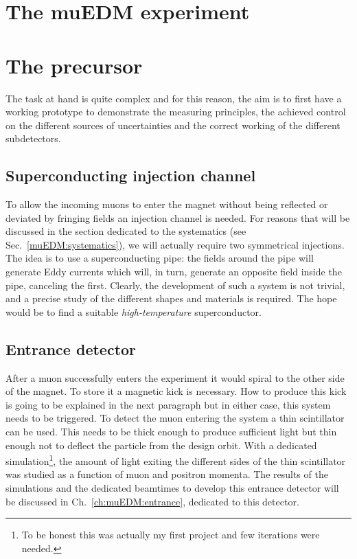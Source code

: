 \begin{refsection}
\section{The muEDM experiment}

\section{The precursor}
    The task at hand is quite complex and for this reason, the aim is to first have a working prototype to demonstrate the measuring principles, the achieved control on the different sources of uncertainties and the correct working of the different subdetectors.
    
    \subsection{Superconducting injection channel}
        To allow the incoming muons to enter the magnet without being reflected or deviated by fringing fields an injection channel is needed.
        For reasons that will be discussed in the section dedicated to the systematics (see Sec.~\ref{muEDM:systematics}), we will actually require two symmetrical injections.
        The idea is to use a superconducting pipe: the fields around the pipe will generate Eddy currents which will, in turn, generate an opposite field inside the pipe, canceling the first.
        Clearly, the development of such a system is not trivial, and a precise study of the different shapes and materials is required. 
        The hope would be to find a suitable \textit{high-temperature} superconductor.

    \subsection{Entrance detector} 
        After a muon successfully enters the experiment it would spiral to the other side of the magnet. 
        To store it a magnetic kick is necessary. 
        How to produce this kick is going to be explained in the next paragraph but in either case, this system needs to be triggered.
        To detect the muon entering the system a thin scintillator can be used.
        This needs to be thick enough to produce sufficient light but thin enough not to deflect the particle from the design orbit.
        With a dedicated \gf simulation\footnote{To be honest this was actually my first \gf project and few iterations were needed.}, the amount of light exiting the different sides of the thin scintillator was studied as a function of muon and positron momenta. 
        The results of the simulations and the dedicated beamtimes to develop this entrance detector will be discussed in Ch.~\ref{ch:muEDM:entrance}, dedicated to this detector.


\end{refsection}
